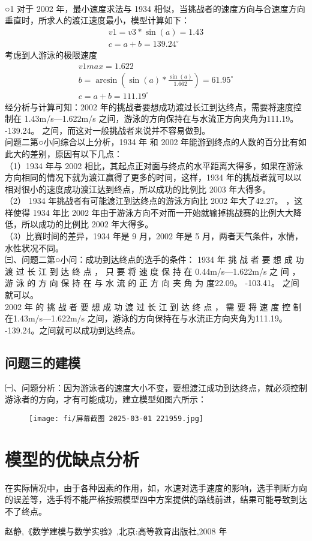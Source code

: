 \documentclass{article}
\begin{document}
\\○1 对于 2002 年，最小速度求法与 1934 相似，当挑战者的速度方向与合速度方向垂直时，所求人的渡江速度最小，模型计算如下：
\begin{eqnarray}
    v1=v3*\sin(a)=1.43
    \\c=a+b=139.24^{\circ}
\end{eqnarray}
考虑到人游泳的极限速度
\begin{eqnarray}
    v1max=1.622
    \\b=\arcsin(\sin(a)*\frac{\sin(a)}{1.662})=61.95^{\circ}
    \\c=a+b=111.19^{\circ}
\end{eqnarray}
 经分析与计算可知：2002 年的挑战者要想成功渡过长江到达终点，需要将速度控制在 1.43m/s—1.622m/s 之间，游泳的方向保持在与水流正方向夹角为111.19。 -139.24。 之间，而这对一般挑战者来说并不容易做到。
\\问题二第○小问综合以上分析，1934 年 和 2002 年能游到终点的人数的百分比有如此大的差别，原因有以下几点：
\\（1）1934 年与 2002 相比，其起点正对面与终点的水平距离大得多，如果在游泳方向相同的情况下就为渡江赢得了更多的时间，这样，1934 年的挑战者就可以以相对很小的速度成功渡江达到终点，所以成功的比例比 2003 年大得多。
\\（2） 1934 年挑战者有可能渡江到达终点的游泳方向比 2002 年大了42.27。 ，这样使得 1934 年比 2002 年由于游泳方向不对而一开始就输掉挑战赛的比例大大降低，所以成功的比例比 2002 年大得多。
\\（3）比赛时间的差异，1934 年是 9 月，2002 年是 5 月，两者天气条件，水情，水性状况不同。
\\㈢、问题二第○小问：成功到达终点的选手的条件：
1934 年 挑 战 者 要 想 成 功 渡 过 长 江 到 达 终 点 ， 只 要 将 速 度 保 持 在
0.44m/s—1.622m/s 之 间 ， 游 泳 的 方 向 保 持 在 与 水 流 的 正 方 向 夹 角 为 度22.09。 -103.41。 之间就可以。
\\2002 年 的 挑 战 者 要 想 成 功 渡 过 长 江 到 达 终 点 ， 需 要 将 速 度 控 制 在1.43m/s—1.622m/s 之间，游泳的方向保持在与水流正方向夹角为111.19。 -139.24。之间就可以成功到达终点。
\subsection{问题三的建模}
㈠、问题分析：因为游泳者的速度大小不变，要想渡江成功到达终点，就必须控制游泳者的方向，才有可能成功，建立模型如图六所示：
\begin{figure}[h]
    \centering
    \texttt{[image: fi/屏幕截图 2025-03-01 221959.jpg]}
\end{figure}
\section{模型的优缺点分析}
在实际情况中，由于各种因素的作用，如，水速对选手速度的影响，选手判断方向的误差等，选手将不能严格按照模型四中方案提供的路线前进，结果可能导致到达不了终点。
\begin{thebibliography}{100}

    赵静,《数学建模与数学实验》,北京:高等教育出版社,2008 年
    
   
\end{thebibliography}
     
\end{document}

